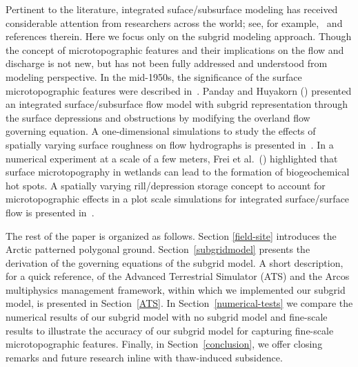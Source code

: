 \documentclass[review,11pt]{elsarticle}
\begin{document}
Pertinent to the literature, integrated suface/subsurface modeling has received considerable attention from researchers across the world; see, for example,~\cite{painter2013modeling,kurylyk2014climate,spainter2016integrated} and references therein. Here we focus only on the subgrid modeling approach. Though the concept of microtopographic features and their implications on the flow and discharge is not new, but has not been fully addressed and understood from modeling perspective. 
In the mid-1950s, the significance of the surface microtopographic features were described in~\cite{stammers1956effect}. Panday and Huyakorn (\citeyear{panday2004fully}) presented an integrated surface/subsurface flow model with subgrid representation through the surface depressions and obstructions by modifying the overland flow governing equation. A one-dimensional simulations to study the effects of spatially varying surface roughness on flow hydrographs is presented in~\cite{huang2009influences}. In a numerical experiment at a scale of a few meters, Frei et al.~(\citeyear{frei2012surface}) highlighted that surface microtopography in wetlands can lead to the formation of biogeochemical hot spots. A spatially varying rill/depression storage concept to account for microtopographic effects in a plot scale simulations for integrated surface/surface flow is presented in~\cite{frei2014representing}.

The rest of the paper is organized as follows. Section \ref{field-site} introduces the Arctic patterned polygonal ground. Section~\ref{subgridmodel} presents the derivation of the governing equations of the subgrid model. A short description, for a quick reference, of the Advanced Terrestrial Simulator (ATS) and the Arcos multiphysics management framework, within which we implemented our subgrid model, is presented in Section~\ref{ATS}. In Section~\ref{numerical-tests} we compare the numerical results of our subgrid model with no subgrid model and fine-scale results to illustrate the accuracy of our subgrid model for capturing fine-scale microtopographic features. Finally, in Section~\ref{conclusion}, we offer closing remarks and future research inline with thaw-induced subsidence.
\end{document}
